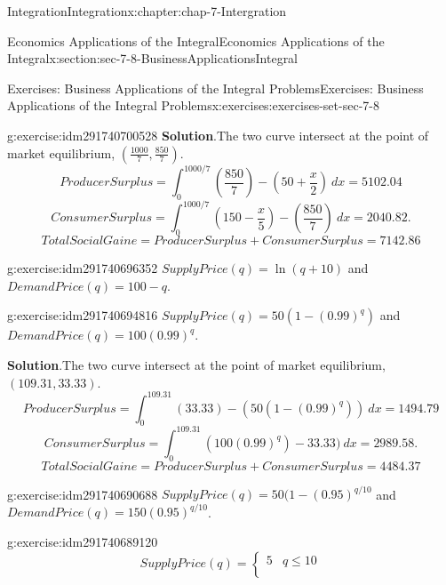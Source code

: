 \documentclass[oneside,10pt,]{book}
\numberwithin{equation}{section}
\begin{document}
\begin{chapterptx}{Integration}{}{Integration}{}{}{x:chapter:chap-7-Intergration}
\begin{sectionptx}{Economics Applications of the Integral}{}{Economics Applications of the Integral}{}{}{x:section:sec-7-8-BusinessApplicationsIntegral}
\begin{exercises-subsection}{Exercises: Business Applications of the Integral Problems}{}{Exercises: Business Applications of the Integral Problems}{}{}{x:exercises:exercises-set-sec-7-8}
\begin{divisionexercise}{1}{}{}{g:exercise:idm291740700528}
\noindent\textbf{Solution}.\hypertarget{g:solution:idm291740699024}{}\quad{}The two curve intersect at the point of market equilibrium, \(\left({\frac{1000}{7},\frac{850}{7}}\right)\).%
%
\begin{equation*}
ProducerSurplus=
\int_0^{1000/7}
\left({\frac{850}{7}}\right)-
\left({50+\frac{x}{2}}\right)\ dx=5102.04
\end{equation*}
%
\begin{equation*}
ConsumerSurplus=
\int_0^{1000/7}
\left({150-\frac{x}{5}}\right)-\left({\frac{850}{7}}\right)\ dx=2040.82.
\end{equation*}
%
\begin{equation*}
TotalSocialGaine=ProducerSurplus+ConsumerSurplus=7142.86
\end{equation*}
\end{divisionexercise}%
\begin{divisionexercise}{2}{}{}{g:exercise:idm291740696352}%
\(SupplyPrice(q)=\ln (q+10)\) and \(DemandPrice(q)= 100-q\).%
\end{divisionexercise}%
\begin{divisionexercise}{3}{}{}{g:exercise:idm291740694816}%
\(SupplyPrice(q)= 50(1-(0.99)^q)\) and \(DemandPrice(q)= 100(0.99)^q\).%
\par\smallskip%
\noindent\textbf{Solution}.\hypertarget{g:solution:idm291740693280}{}\quad{}The two curve intersect at the point of market equilibrium, \((109.31, 33.33)\).%
%
\begin{equation*}
ProducerSurplus=
\int_0^{109.31}
(33.33)-
\left({50(1-(0.99)^q)}\right)\ dx=1494.79
\end{equation*}
%
\begin{equation*}
ConsumerSurplus=
\int_0^{109.31}
\left({100(0.99)^q}\right)-33.33)\ dx=2989.58.
\end{equation*}
%
\begin{equation*}
TotalSocialGaine=ProducerSurplus+ConsumerSurplus=4484.37
\end{equation*}
\end{divisionexercise}%
\begin{divisionexercise}{4}{}{}{g:exercise:idm291740690688}%
\(SupplyPrice(q)= 50(1-(0.95)^{q/10}\) and \(DemandPrice(q)= 150(0.95)^{q/10}\).%
\end{divisionexercise}%
\begin{divisionexercise}{5}{}{}{g:exercise:idm291740689120}%
%
\begin{equation*}
SupplyPrice(q)=\begin{cases}
5&q\le 10\\

\end{cases}
\end{equation*}
\end{divisionexercise}
\end{exercises-subsection}
\end{sectionptx}
\end{chapterptx}
\end{document}
